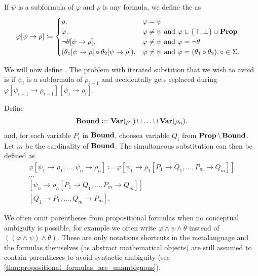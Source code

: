 \begin{definition}\label{def:propositional_substition}
  If $\psi$ is a subformula of $\varphi$ and $\rho$ is any formula, we define the  as
  \begin{align*}
    \varphi[\psi \to \rho] &\coloneqq \begin{cases}
      \rho,                                                    &\varphi = \psi \\
      \varphi,                                                 &\varphi \neq \psi \text{ and } \varphi \in \{ \top, \bot \} \cup \operatorname{\mathbf{Prop}} \\
      \neg \theta[\psi \to \rho],                              &\varphi \neq \psi \text{ and } \varphi = \neg \theta \\
      (\theta_1[\psi \to \rho] \circ \theta_2[\psi \to \rho]), &\varphi \neq \psi \text{ and } \varphi = (\theta_1 \circ \theta_2), \circ \in \Sigma.
    \end{cases}
  \end{align*}

  We will now define . The problem with iterated substition that we wish to avoid is if $\psi_i$ is a subformula of $\rho_{i-1}$ and accidentally gets replaced during $\varphi[\psi_{i-1} \to \rho_{i-1}][\psi_i \to \rho_i]$.

  Define
  \begin{align*}
    \operatorname{\mathbf{Bound}} \coloneqq \operatorname{\mathbf{Var}}(\rho_1) \cup \ldots \cup \operatorname{\mathbf{Var}}(\rho_n).
  \end{align*}
  and, for each variable $P_i$ in $\operatorname{\mathbf{Bound}}$, choose\AOC a variable $Q_i$ from $\operatorname{\mathbf{Prop}} \setminus \operatorname{\mathbf{Bound}}$. Let $m$ be the cardinality of $\operatorname{\mathbf{Bound}}$. The simultaneous substitution can then be defined as
  \begin{align*}
    \varphi[\psi_1 \to \rho_1, \ldots, \psi_n \to \rho_n] \coloneqq \varphi
    [\psi_1 \to \rho_1[P_1 \to Q_1, \ldots, P_m \to Q_m]] \\
    \ldots \\
    [\psi_n \to \rho_n[P_1 \to Q_1, \ldots, P_m \to Q_m]] \\
    [Q_1 \to P_1, \ldots, Q_m \to P_m].
  \end{align*}
\end{definition}

\begin{note}\label{note:propositional_formula_parentheses}
  We often omit parentheses from propositional formulas when no conceptual ambiguity is possible, for example we often write $\varphi \land \psi \land \theta$ instead of $((\varphi \land \psi) \land \theta)$. These are only notations shortcuts in the metalanguage and the formulas themselves (as abstract mathematical objects) are still assumed to contain parentheses to avoid syntactic ambiguity (see \cref{thm:propositional_formulas_are_unambiguous}).
\end{note}

